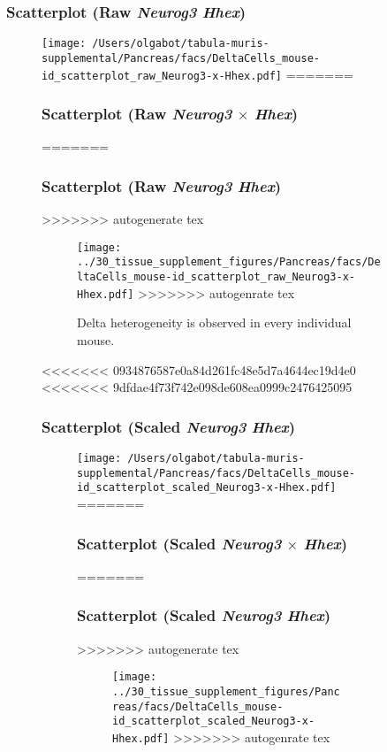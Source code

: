 \subsubsection{Scatterplot (Raw \emph{Neurog3} \texttimes \emph{Hhex})}
\begin{figure}[h]
\centering
\texttt{[image: /Users/olgabot/tabula-muris-supplemental/Pancreas/facs/DeltaCells\_mouse-id\_scatterplot\_raw\_Neurog3-x-Hhex.pdf]}
=======
\subsubsection{Scatterplot (Raw \emph{Neurog3} $\times$ \emph{Hhex})}
=======
\subsubsection{Scatterplot (Raw \emph{Neurog3} \texttimes \emph{Hhex})}
>>>>>>> autogenerate tex
\begin{figure}[h]
\centering
\texttt{[image: ../30\_tissue\_supplement\_figures/Pancreas/facs/DeltaCells\_mouse-id\_scatterplot\_raw\_Neurog3-x-Hhex.pdf]}
>>>>>>> autogenrate tex

\caption{Delta heterogeneity is observed in every individual mouse.
}
\end{figure}


\clearpage

<<<<<<< 0934876587e0a84d261fc48e5d7a4644ec19d4e0
<<<<<<< 9dfdae4f73f742e098de608ea0999c2476425095
\subsubsection{Scatterplot (Scaled \emph{Neurog3} \texttimes \emph{Hhex})}
\begin{figure}[h]
\centering
\texttt{[image: /Users/olgabot/tabula-muris-supplemental/Pancreas/facs/DeltaCells\_mouse-id\_scatterplot\_scaled\_Neurog3-x-Hhex.pdf]}
=======
\subsubsection{Scatterplot (Scaled \emph{Neurog3} $\times$ \emph{Hhex})}
=======
\subsubsection{Scatterplot (Scaled \emph{Neurog3} \texttimes \emph{Hhex})}
>>>>>>> autogenerate tex
\begin{figure}[h]
\centering
\texttt{[image: ../30\_tissue\_supplement\_figures/Pancreas/facs/DeltaCells\_mouse-id\_scatterplot\_scaled\_Neurog3-x-Hhex.pdf]}
>>>>>>> autogenrate tex


\end{figure}
\end{figure}
\end{figure}
